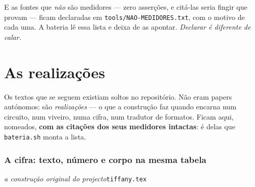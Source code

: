 \documentclass[11pt]{article}
\newcommand{\code}[1]{\texttt{\small #1}}
\newcommand{\R}{\mathbb R}
\theoremstyle{plain}
\theoremstyle{remark}
\begin{document}
\noindent E as fontes que \emph{não} são medidores --- zero asserções, e citá-las seria fingir que
provam --- ficam declaradas em \code{tools/NAO-MEDIDORES.txt}, com o motivo de cada uma. A bateria
lê essa lista e deixa de as apontar. \emph{Declarar é diferente de calar.}



\part{As realizações}\label{part:realizacoes}

Os textos que se seguem existiam soltos no repositório. Não eram papers autónomos: são
\emph{realizações} --- o que a construção faz quando encarna num circuito, num viveiro, numa
cifra, num tradutor de formatos. Ficam aqui, nomeados, \textbf{com as citações dos seus
medidores intactas}: é delas que \code{bateria.sh} monta a lista.

\section{A cifra: texto, número e corpo na mesma tabela}

\noindent\emph{a construção original do projecto}\hfill\code{tiffany.tex}




\begin{abstract}
\noindent A \textbf{Tiffany} é o \emph{mesmo} circuito autossimilar --- o gato e o seu esquilo, o
corpo $\R^n$ de \texttt{teoria.tex}, o gabarito de \texttt{microprocessador.tex} --- posto a
trabalhar sobre a \textbf{fala}. O seu coração é uma \textbf{dualidade}: o \textbf{corpus} é o
atrator \emph{branco} (a fonte, o gato que expande) e a \textbf{fala} é o \emph{negro} (o sorvedouro,
o esquilo que reconstrói) --- os dois eixos conjugados de $\mathbb C$ que o espelho troca. E nada se
constrói: \emph{transformada}, \emph{convolução}, \emph{deconvolução}, \emph{inversa} são nomes do que
o circuito, sendo o corpo, já faz --- e a resposta apenas se \textbf{colhe} no caminho que passa pela
fala. O ciclo \emph{queda $\to$ caminho $\to$ reconstrução} é medido dos dois lados, digital e
analógico, com resíduo $0$ (§5).

\medskip
\noindent E há um limite, medido e não escondido, que o §6 relata inteiro. A \textbf{tradução} por
\emph{embedding} exato \textbf{não fecha}: provou-se, por contradição interna, que não existe
atribuição de vetores às palavras que satisfaça o corpus (§6), e a causa não é o léxico nem a rotação
--- é \textbf{contagem}, pois um corpus real tem muito mais frases que palavras. A saída que os
números apontam não é estatística: é \textbf{métrica}, isto é, o modo analógico --- e é para lá que o
documento aponta ao fim. \emph{Um número que não sobrevive a ser medido duas vezes não é um número} ---
vale para toda afirmação daqui, inclusive as que derrubaram o que se esperava.
\end{abstract}
\end{document}
